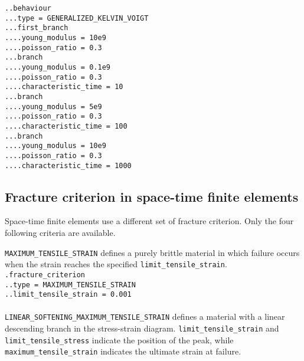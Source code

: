\documentclass[10pt]{article}
\begin{document}
\noindent \verb+..behaviour+\\
\verb+...type = GENERALIZED_KELVIN_VOIGT+\\
\verb+...first_branch+\\
\verb+....young_modulus = 10e9+\\
\verb+....poisson_ratio = 0.3+\\
\verb+...branch+\\
\verb+....young_modulus = 0.1e9+\\
\verb+....poisson_ratio = 0.3+\\
\verb+....characteristic_time = 10+\\
\verb+...branch+\\
\verb+....young_modulus = 5e9+\\
\verb+....poisson_ratio = 0.3+\\
\verb+....characteristic_time = 100+\\
\verb+...branch+\\
\verb+....young_modulus = 10e9+\\
\verb+....poisson_ratio = 0.3+\\
\verb+....characteristic_time = 1000+

\subsection{Fracture criterion in space-time finite elements}

Space-time finite elements use a different set of fracture criterion. Only the four following criteria are available.

\verb+MAXIMUM_TENSILE_STRAIN+ defines a purely brittle material in which failure occurs when the strain reaches the specified \verb+limit_tensile_strain+.\\

\noindent \verb+.fracture_criterion+\\
\verb+..type = MAXIMUM_TENSILE_STRAIN+\\
\verb+..limit_tensile_strain = 0.001+

\paragraph{} \verb+LINEAR_SOFTENING_MAXIMUM_TENSILE_STRAIN+ defines a material with a linear descending branch in the stress-strain diagram. \verb+limit_tensile_strain+ and \verb+limit_tensile_stress+ indicate the position of the peak, while \verb+maximum_tensile_strain+ indicates the ultimate strain at failure.\\
\end{document}

